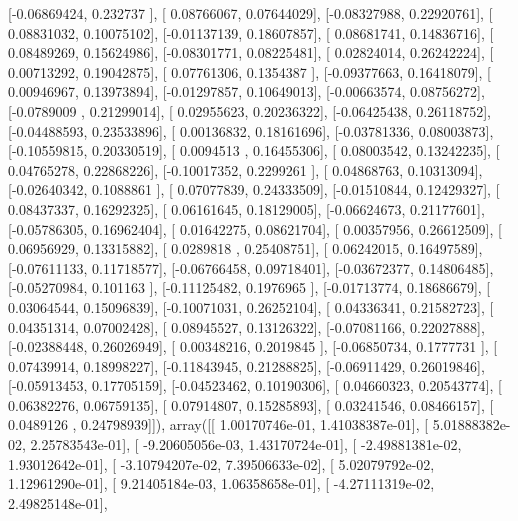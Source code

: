\documentclass{article}
\begin{document}
       [-0.06869424,  0.232737  ],
       [ 0.08766067,  0.07644029],
       [-0.08327988,  0.22920761],
       [ 0.08831032,  0.10075102],
       [-0.01137139,  0.18607857],
       [ 0.08681741,  0.14836716],
       [ 0.08489269,  0.15624986],
       [-0.08301771,  0.08225481],
       [ 0.02824014,  0.26242224],
       [ 0.00713292,  0.19042875],
       [ 0.07761306,  0.1354387 ],
       [-0.09377663,  0.16418079],
       [ 0.00946967,  0.13973894],
       [-0.01297857,  0.10649013],
       [-0.00663574,  0.08756272],
       [-0.0789009 ,  0.21299014],
       [ 0.02955623,  0.20236322],
       [-0.06425438,  0.26118752],
       [-0.04488593,  0.23533896],
       [ 0.00136832,  0.18161696],
       [-0.03781336,  0.08003873],
       [-0.10559815,  0.20330519],
       [ 0.0094513 ,  0.16455306],
       [ 0.08003542,  0.13242235],
       [ 0.04765278,  0.22868226],
       [-0.10017352,  0.2299261 ],
       [ 0.04868763,  0.10313094],
       [-0.02640342,  0.1088861 ],
       [ 0.07077839,  0.24333509],
       [-0.01510844,  0.12429327],
       [ 0.08437337,  0.16292325],
       [ 0.06161645,  0.18129005],
       [-0.06624673,  0.21177601],
       [-0.05786305,  0.16962404],
       [ 0.01642275,  0.08621704],
       [ 0.00357956,  0.26612509],
       [ 0.06956929,  0.13315882],
       [ 0.0289818 ,  0.25408751],
       [ 0.06242015,  0.16497589],
       [-0.07611133,  0.11718577],
       [-0.06766458,  0.09718401],
       [-0.03672377,  0.14806485],
       [-0.05270984,  0.101163  ],
       [-0.11125482,  0.1976965 ],
       [-0.01713774,  0.18686679],
       [ 0.03064544,  0.15096839],
       [-0.10071031,  0.26252104],
       [ 0.04336341,  0.21582723],
       [ 0.04351314,  0.07002428],
       [ 0.08945527,  0.13126322],
       [-0.07081166,  0.22027888],
       [-0.02388448,  0.26026949],
       [ 0.00348216,  0.2019845 ],
       [-0.06850734,  0.1777731 ],
       [ 0.07439914,  0.18998227],
       [-0.11843945,  0.21288825],
       [-0.06911429,  0.26019846],
       [-0.05913453,  0.17705159],
       [-0.04523462,  0.10190306],
       [ 0.04660323,  0.20543774],
       [ 0.06382276,  0.06759135],
       [ 0.07914807,  0.15285893],
       [ 0.03241546,  0.08466157],
       [ 0.0489126 ,  0.24798939]]), array([[  1.00170746e-01,   1.41038387e-01],
       [  5.01888382e-02,   2.25783543e-01],
       [ -9.20605056e-03,   1.43170724e-01],
       [ -2.49881381e-02,   1.93012642e-01],
       [ -3.10794207e-02,   7.39506633e-02],
       [  5.02079792e-02,   1.12961290e-01],
       [  9.21405184e-03,   1.06358658e-01],
       [ -4.27111319e-02,   2.49825148e-01],
\end{document}
